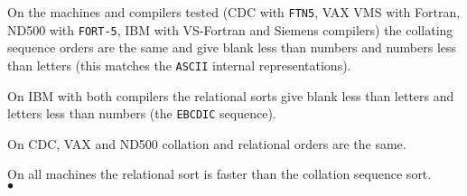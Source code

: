\Notes
On the  machines and compilers tested
(CDC with {\tt FTN5}, VAX VMS with Fortran, ND500 with
{\tt FORT-5}, IBM with VS-Fortran and Siemens compilers)
the collating sequence orders are the same and give blank less than
numbers and numbers less than letters (this matches the {\tt ASCII}
internal representations).
\par
On IBM with both compilers the relational sorts give blank less
than letters and letters less than numbers (the {\tt EBCDIC} sequence).
\par
On CDC, VAX and ND500 collation and relational orders are the same.
\par
On all machines the relational sort is faster than the collation
sequence sort.
\\ $\bullet$
